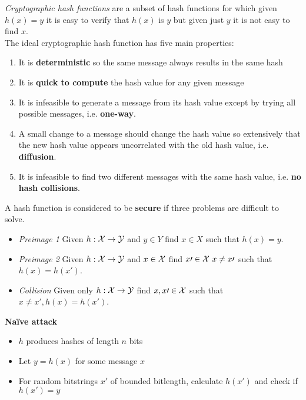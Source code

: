 \begin{definition}
    \textit{Cryptographic hash functions} are a subset of hash functions
    for which given $h(x) = y$ it is easy to verify that $h(x)$ is $y$
    but given just $y$ it is not easy to find $x$.\\

    The ideal cryptographic hash function has five main properties:
    \begin{enumerate}
        \item It is \textbf{deterministic} so the same message always results in the same hash
        \item It is \textbf{quick to compute} the hash value for any given message
        \item It is infeasible to generate a message from its hash value except by trying all possible messages,
            i.e. \textbf{one-way}.
        \item A small change to a message should change the hash value so extensively that the new hash value appears uncorrelated with the old hash value,
            i.e. \textbf{diffusion}.
        \item It is infeasible to find two different messages with the same hash value,
            i.e. \textbf{no hash collisions}.
    \end{enumerate}
\end{definition}

A hash function is considered to be \textbf{secure} if three problems are difficult to solve.
\begin{itemize}
    \item \textit{Preimage 1}
        Given $h : \mathcal{X} \rightarrow \mathcal{Y}$
        and $y \in Y$
        find $x \in X$
        such that $h(x) = y$.
    \item \textit{Preimage 2}
        Given $h : \mathcal{X} \rightarrow \mathcal{Y}$
        and $x \in \mathcal{X}$
        find $x\prime \in \mathcal{X}\ x \neq x\prime$
        such that $h(x) = h(x\prime)$.
    \item \textit{Collision}
        Given only $h : \mathcal{X} \rightarrow \mathcal{Y}$
        find $x, x\prime \in \mathcal{X}$
        such that $x \neq x\prime, h(x) = h(x\prime)$.
\end{itemize}

\textbf{Na\"ive attack}\\
\begin{itemize}
    \item $h$ produces hashes of length $n$ bits
    \item Let $y = h(x)$ for some message $x$
    \item For random bitstrings $x\prime$ of bounded bitlength,
        calculate $h(x\prime)$ and check if $h(x\prime) = y$
\end{itemize}

